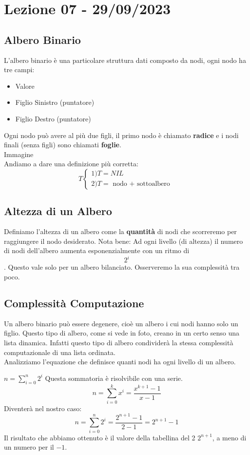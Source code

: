 \section{Lezione 07 - 29/09/2023}
\subsection{Albero Binario}
L'albero binario è una particolare struttura dati composto da nodi, ogni nodo ha tre campi:
\begin{itemize}
\item Valore
\item Figlio Sinistro (puntatore)
\item Figlio Destro (puntatore)
\end{itemize}
Ogni nodo può avere al più due figli, il primo nodo è chiamato \textbf{radice} e i nodi finali (senza figli) sono chiamati \textbf{foglie}.\\
Immagine\\
Andiamo a dare una definizione più corretta:
$$
T
\begin{cases}
  1) T=NIL\\
  2) T=\text{ nodo + sottoalbero }
  \end{cases}
$$

\subsection{Altezza di un Albero}
Definiamo l'altezza di un albero come la \textbf{quantità} di nodi che scorreremo per raggiungere il nodo desiderato.
Nota bene: Ad ogni livello (di altezza) il numero di nodi dell'albero aumenta esponenzialmente con un ritmo di $$2^i$$. Questo vale solo per un albero bilanciato. Osserveremo la sua complessità tra poco.

\subsection{Complessità Computazione}
Un albero binario può essere degenere, cioè un albero i cui nodi hanno solo un figlio. Questo tipo di albero, come si vede in foto, creano in un certo senso una lista dinamica. Infatti questo tipo di albero condividerà la stessa complessità computazionale di una lista ordinata.
\\
Analizziamo l'equazione che definisce quanti nodi ha ogni livello di un albero.

$n=\sum_{i=0}^{n}2^i$
Questa sommatoria è risolvibile con una serie.
$$n=\sum_{i=0}^{k} x^i = \frac{x^{k+1}-1}{x-1}$$
Diventerà nel nostro caso:
$$n=\sum_{i=0}^{n}2^i = \frac{2^{n+1}-1}{2-1} = 2^{n+1}-1$$
Il risultato che abbiamo ottenuto è il valore della tabellina del 2 $2^{n+1}$, a meno di un numero per il $-1$.

